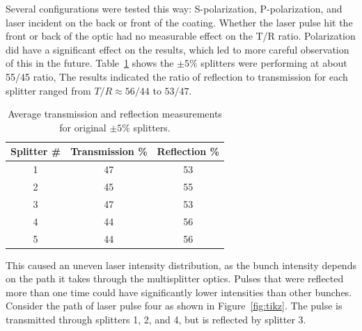 Several configurations were tested this way: S-polarization, P-polarization, 
and laser incident on the back or front of the coating. 
Whether the laser pulse hit the front or back of the optic
had no measurable effect on the T/R ratio. Polarization did have a significant effect on
the results, which led to more careful observation of this in the future.
Table~\ref{tab:reflection} shows the $\pm 5\%$ splitters were performing at about 55/45 ratio, 
The results indicated the ratio of reflection to transmission for each splitter ranged from 
$T/R\approx56/44$ to $53/47$. 
\begin{table}%
	\begin{center}
		\caption{Average transmission and reflection measurements for original $\pm 5\%$ splitters.}
		\label{tab:reflection}
		\begin{tabular}{ccc}
			\toprule
			\toprule
			\textbf{Splitter \#} & \textbf{Transmission \%}  & \textbf{Reflection \%} \\ \hline
			1 &  47  &  53   \\ %
			2 &  45  &  55   \\ %
			3 &  47  &  53   \\		 
			4 &  44  & 	56	\\
			5 &  44  &  56   \\ \hline
		\end{tabular}	
	\end{center}
\end{table}
This caused an uneven laser intensity distribution, as the bunch intensity depends on the path 
it takes through the multisplitter optics. Pulses that were reflected more than one
time could have significantly lower intensities than other bunches. 
Consider the path of laser pulse four as shown in Figure~\ref{fig:tikz}. 
The pulse is transmitted through splitters 1, 2, and 4, but is reflected by splitter 3.
\def \delayvertical {1.5}
\def \delayoneleft {7.5}
\def \delaytworight{15}
\def \mycenter{10.0}
\def \labels{6.5}
\def \sone {-0.5}
\def \stwo {\sone+1.5}
\def \sthree {\stwo+1.5}
\def \sfour {\sthree+1.5}
\def \buffer{-4.5}

